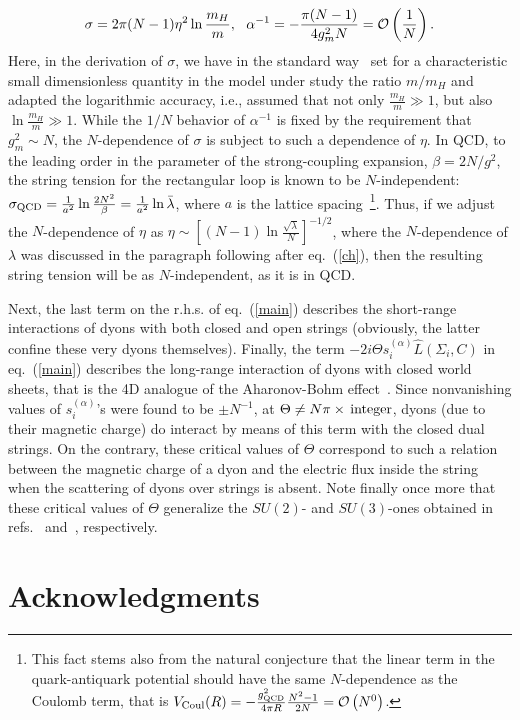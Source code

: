 \documentclass[a4paper,12pt]{article}
\begin{document}
$$
\sigma=2\pi(N-1)\eta^2\ln\frac{m_H}{m},~~\alpha^{-1}=-\frac{\pi(N-1)}{4g_m^2N}={\cal O}\left(\frac{1}{N}\right).$$
Here, in the derivation of $\sigma$, we have in the standard way~\cite{ano} set for a characteristic small
dimensionless quantity in the model under study the ratio $m/m_H$ and adapted the logarithmic accuracy, i.e.,
assumed that not only $\frac{m_H}{m}\gg1$, but also $\ln\frac{m_H}{m}\gg1$. While the $1/N$ behavior
of $\alpha^{-1}$ is fixed by the requirement that $g_m^2\sim N$,
the $N$-dependence of $\sigma$ is subject to such a dependence of $\eta$. In QCD, to the leading order in the
parameter of the strong-coupling expansion, $\beta=2N/g^2$, the string tension for the rectangular
loop is known to be $N$-independent: $\sigma_{\rm QCD}=\frac{1}{a^2}\ln\frac{2N^2}{\beta}=\frac{1}{a^2}\ln\bar\lambda$,
where $a$ is the lattice spacing~\footnote{This fact stems also from the natural conjecture that the linear term in the
quark-antiquark potential should have the same $N$-dependence as the Coulomb term, that is
$V_{\rm Coul}(R)=-\frac{g_{\rm QCD}^2}{4\pi R}\frac{N^2-1}{2N}={\cal O}\left(N^0\right)$.}. Thus, if we adjust the $N$-dependence of $\eta$
as $\eta\sim\left[(N-1)\ln\frac{\sqrt{\lambda}}{N}\right]^{-1/2}$, where the $N$-dependence of $\lambda$ was discussed
in the paragraph following after eq.~(\ref{ch}), then the resulting string tension will be as $N$-independent,
as it is in QCD.


Next, the last term on the r.h.s. of eq.~(\ref{main}) describes
the short-range interactions
of dyons with both closed and open strings (obviously, the latter confine these very dyons themselves).
Finally, the term $-2i\Theta s_i^{(\alpha)}\hat L\left(\Sigma_i,C\right)$ in eq.~(\ref{main})
describes the long-range
interaction of dyons with closed world sheets, that is the 4D analogue of the Aharonov-Bohm effect~\cite{four}.
Since nonvanishing values of $s_i^{(\alpha)}$'s were found to be $\pm N^{-1}$,
at $\Theta\ne N\pi\times{\,}{\rm integer}$,
dyons (due to their magnetic charge) do interact by means of this term with the closed dual strings.
On the contrary, these critical values of $\Theta$
correspond to such a relation
between the magnetic charge of a dyon and the electric flux inside the
string when the scattering of dyons over strings is absent.
Note finally once more that these critical values of $\Theta$ generalize the $SU(2)$- and $SU(3)$-ones
obtained in refs.~\cite{emil} and~\cite{theta}, respectively.


\section{Acknowledgments}
\end{document}
